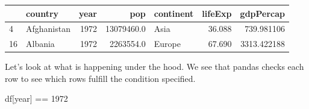 \documentclass[
  letterpaper,
  DIV=11,
  numbers=noendperiod]{scrreprt}
\newenvironment{Shaded}{\begin{snugshade}}{\end{snugshade}}
\newcommand{\DecValTok}[1]{\textcolor[rgb]{0.68,0.00,0.00}{#1}}
\newcommand{\NormalTok}[1]{\textcolor[rgb]{0.00,0.23,0.31}{#1}}
\newcommand{\OperatorTok}[1]{\textcolor[rgb]{0.37,0.37,0.37}{#1}}
\newcommand{\StringTok}[1]{\textcolor[rgb]{0.13,0.47,0.30}{#1}}
\begin{document}
\begin{tabular}{llrrlrr}
\toprule
{} &      country &  year &         pop & continent &  lifeExp &    gdpPercap \\
\midrule
4  &  Afghanistan &  1972 &  13079460.0 &      Asia &   36.088 &   739.981106 \\
16 &      Albania &  1972 &   2263554.0 &    Europe &   67.690 &  3313.422188 \\
\bottomrule
\end{tabular}

Let's look at what is happening under the hood. We see that pandas
checks each row to see which rows fulfill the condition specified.

\begin{Shaded}
\begin{Highlighting}[]
\NormalTok{df[}\StringTok{\textquotesingle{}year\textquotesingle{}}\NormalTok{] }\OperatorTok{==} \DecValTok{1972}
\end{Highlighting}
\end{Shaded}
\end{document}
